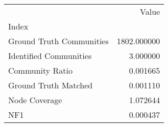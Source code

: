 \begin{tabular}{lr}
\toprule
{} &        Value \\
Index                    &              \\
\midrule
Ground Truth Communities &  1802.000000 \\
Identified Communities   &     3.000000 \\
Community Ratio          &     0.001665 \\
Ground Truth Matched     &     0.001110 \\
Node Coverage            &     1.072644 \\
NF1                      &     0.000437 \\
\bottomrule
\end{tabular}

